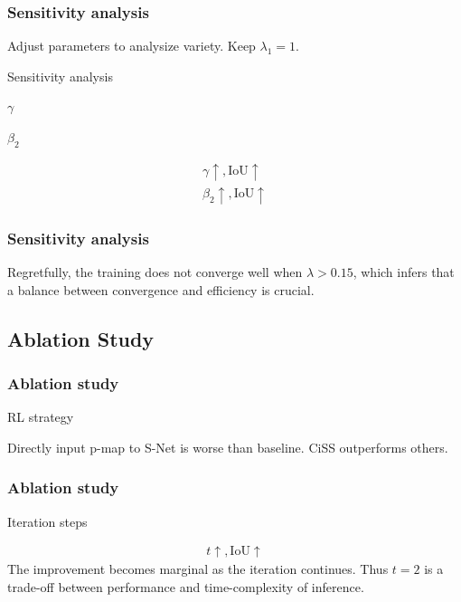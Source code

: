\documentclass[12pt, aspectratio = 169, xcolor = x11names]{beamer}
\begin{document}
\begin{frame}
  \frametitle{Sensitivity analysis}
  Adjust parameters to analysize variety. Keep $\lambda_1 = 1$.
  \begin{table}[htbp]
    \centering
    \caption{Sensitivity analysis}%
    \label{tab:sensitivity_analysis}
    \begin{subtable}[htbp]{0.45\linewidth}
      \centering
      \caption{$\gamma$}%
      \label{tab:gamma}
      \tiny
    \end{subtable}
    \quad
    \begin{subtable}[htbp]{0.45\linewidth}
      \centering
      \caption{$\beta_2$}%
      \label{tab:beta}
      \tiny
    \end{subtable}
  \end{table}
  \pause%
  \begin{align*}
    \gamma \uparrow, \mathrm{IoU} \uparrow\\
    \beta_2 \uparrow, \mathrm{IoU} \uparrow
  \end{align*}
\end{frame}

\begin{frame}
  \frametitle{Sensitivity analysis}
  Regretfully, the training does not converge well when $\lambda > 0.15$,
  which infers that a balance between convergence and efficiency is crucial.
\end{frame}

\subsection{Ablation Study}%
\label{sub:ablation_study}

\begin{frame}
  \frametitle{Ablation study}
  \begin{table}[htbp]
    \centering
    \caption{RL strategy}%
    \label{tab:rl_strategy}
    \tiny
  \end{table}
  Directly input p-map to S-Net is worse than baseline.
  CiSS outperforms others.
\end{frame}

\begin{frame}
  \frametitle{Ablation study}
  \begin{table}[htbp]
    \centering
    \caption{Iteration steps}%
    \label{tab:iteration_steps}
    \tiny
  \end{table}
  \begin{align*}
    t \uparrow, \mathrm{IoU} \uparrow
  \end{align*}
  The improvement becomes marginal as the iteration continues.
  Thus $t = 2$ is a trade-off between performance and time-complexity of
  inference.
\end{frame}
\end{document}
